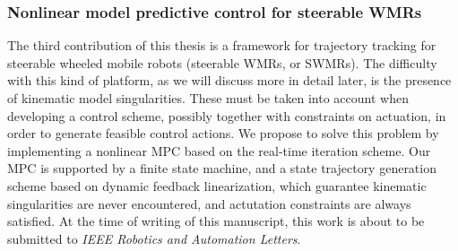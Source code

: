 \subsubsection{Nonlinear model predictive control for steerable WMRs}
The third contribution of this thesis is a framework for trajectory tracking 
for steerable wheeled mobile robots (steerable WMRs, or SWMRs).
The difficulty with this kind of platform,
as we will discuss more in detail later, is the presence of kinematic model 
singularities. These must be taken into account when developing a control 
scheme, possibly together with constraints on actuation, in order to generate
feasible control actions. We propose to solve this problem by implementing a 
nonlinear MPC based on the real-time iteration scheme. Our MPC is supported by a 
finite state machine, and a state trajectory generation scheme based 
on dynamic feedback linearization, which guarantee kinematic singularities 
are never encountered, and actutation constraints are always satisfied.
At the time of writing of this manuscript, this work is about to be 
submitted to \textit{IEEE Robotics and Automation Letters}.

